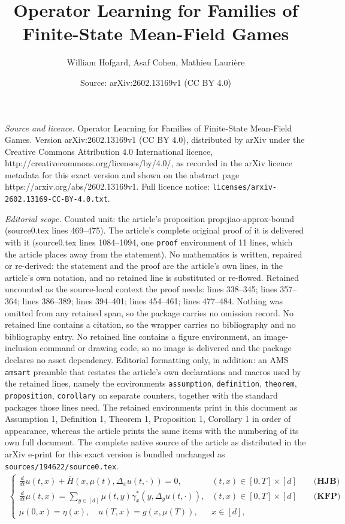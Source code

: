 \documentclass[10pt,a4paper]{amsart}
\title{Operator Learning for Families of Finite-State Mean-Field Games}
\author{William Hofgard, Asaf Cohen, Mathieu Lauri\`ere}
\date{Source: arXiv:2602.13169v1 (CC BY 4.0)}
\begin{document}
\maketitle

\noindent\emph{Source and licence.} Operator Learning for Families of Finite-State Mean-Field Games. Version arXiv:2602.13169v1 (CC BY 4.0), distributed by arXiv under the Creative Commons Attribution 4.0 International licence, http://creativecommons.org/licenses/by/4.0/, as recorded in the arXiv licence metadata for this exact version and shown on the abstract page https://arxiv.org/abs/2602.13169v1. Full licence notice: \texttt{licenses/arxiv-2602.13169-CC-BY-4.0.txt}.\par\smallskip

\noindent\textit{Editorial scope.} Counted unit: the article's proposition prop:jiao-approx-bound (source0.tex lines 469--475). The article's complete original proof of it is delivered with it (source0.tex lines 1084--1094, one \texttt{proof} environment of 11 lines, which the article places away from the statement). No mathematics is written, repaired or re-derived: the statement and the proof are the article's own lines, in the article's own notation, and no retained line is substituted or re-flowed.  Retained uncounted as the source-local context the proof needs: lines 338--345; lines 357--364; lines 386--389; lines 394--401; lines 454--461; lines 477--484.  Nothing was omitted from any retained span, so the package carries no omission record.  No retained line contains a citation, so the wrapper carries no bibliography and no bibliography entry.  No retained line contains a figure environment, an image-inclusion command or drawing code, so no image is delivered and the package declares no asset dependency.  Editorial formatting only, in addition: an AMS \texttt{amsart} preamble that restates the article's own declarations and macros used by the retained lines, namely the environments \texttt{assumption}, \texttt{definition}, \texttt{theorem}, \texttt{proposition}, \texttt{corollary} on separate counters, together with the standard packages those lines need.  The retained environments print in this document as Assumption 1, Definition 1, Theorem 1, Proposition 1, Corollary 1 in order of appearance, whereas the article prints the same items with the numbering of its own full document.  The complete native source of the article as distributed in the arXiv e-print for this exact version is bundled unchanged as \texttt{sources/194622/source0.tex}.
\begin{align}
\label{eqn:mfg}
\begin{cases}
    \frac{d}{dt} u (t,x) + \bar H(x, \mu(t), \Delta_x u (t,\cdot)) = 0, & (t,x) \in [0, T] \times [d] \qquad \textbf{(HJB)} \\
    \frac{d}{dt} \mu (t,x) = \sum_{y\in [d]} \mu (t,y) \gamma^*_x(y,\Delta_y u (t,\cdot)), & (t,x) \in [0, T] \times [d] \qquad \textbf{(KFP)} \\
    \mu (0, x) = \eta(x), \quad u(T, x) = g(x, \mu(T)), & x \in [d],
\end{cases}
\end{align}
\end{document}
